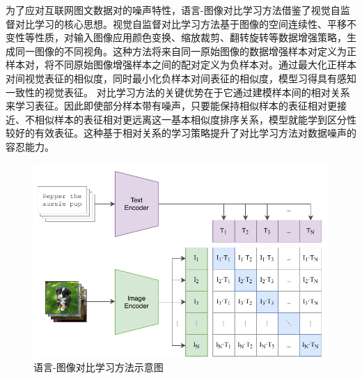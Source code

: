 为了应对互联网图文数据对的噪声特性，语言-图像对比学习方法\cite{radford2021learning}借鉴了视觉自监督对比学习的核心思想。视觉自监督对比学习方法\cite{chen2020simple}基于图像的空间连续性、平移不变性等性质，对输入图像应用颜色变换、缩放裁剪、翻转旋转等数据增强策略，生成同一图像的不同视角。这种方法将来自同一原始图像的数据增强样本对定义为正样本对，将不同原始图像增强样本之间的配对定义为负样本对。通过最大化正样本对间视觉表征的相似度，同时最小化负样本对间表征的相似度，模型习得具有感知一致性的视觉表征。
对比学习方法的关键优势在于它通过建模样本间的相对关系来学习表征。因此即使部分样本带有噪声，只要能保持相似样本的表征相对更接近、不相似样本的表征相对更远离这一基本相似度排序关系，模型就能学到区分性较好的有效表征。这种基于相对关系的学习策略提升了对比学习方法对数据噪声的容忍能力。

\begin{figure}
  \centering
  \includegraphics[width=0.9\linewidth]{figures/论文-图6-CLIP-方法.pdf}
  \caption{语言-图像对比学习方法\cite{radford2021learning}示意图}
  \label{fig:6-CLIP-Method}
\end{figure}

